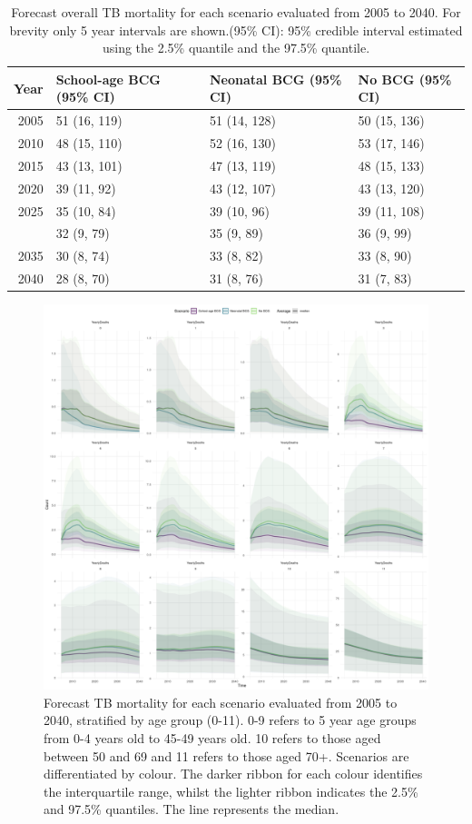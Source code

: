 \documentclass[11pt,twoside]{bristolthesis}
\begin{document}
  \begin{longtable}{rlll}
  \caption[Forecast overall TB mortality for each scenario evaluated from 2005 to 2040.]{\label{tab:10-table-deaths-preds}Forecast overall TB mortality for each scenario evaluated from 2005 to 2040. For brevity only 5 year intervals are shown.(95\% CI): 95\% credible interval estimated using the 2.5\% quantile and the 97.5\% quantile.}\\
  \toprule
  Year & School-age BCG (95\% CI) & Neonatal BCG (95\% CI) & No BCG (95\% CI)\\
  \midrule
  2005 & 51 (16, 119) & 51 (14, 128) & 50 (15, 136)\\
  2010 & 48 (15, 110) & 52 (16, 130) & 53 (17, 146)\\
  2015 & 43 (13, 101) & 47 (13, 119) & 48 (15, 133)\\
  2020 & 39 (11, 92) & 43 (12, 107) & 43 (13, 120)\\
  2025 & 35 (10, 84) & 39 (10, 96) & 39 (11, 108)\\
  \addlinespace
  2030 & 32 (9, 79) & 35 (9, 89) & 36 (9, 99)\\
  2035 & 30 (8, 74) & 33 (8, 82) & 33 (8, 90)\\
  2040 & 28 (8, 70) & 31 (8, 76) & 31 (7, 83)\\
  \bottomrule
  \end{longtable}
  \begin{figure}
  
  {\centering \includegraphics[width=0.8\linewidth]{chapters/model-fitting/plots/overview-scenarios-deaths-future-age-1} 
  
  }
  
  \caption[Forecast TB mortality for each scenario evaluated from 2005 to 2040, stratified by age group, stratified by age group.]{Forecast TB mortality for each scenario evaluated from 2005 to 2040, stratified by age group (0-11). 0-9 refers to 5 year age groups from 0-4 years old to 45-49 years old. 10 refers to those aged between 50 and 69 and 11 refers to those aged 70+. Scenarios are differentiated by colour. The darker ribbon for each colour identifies the interquartile range, whilst the lighter ribbon indicates the 2.5\% and 97.5\% quantiles. The line represents the median.}\label{fig:10-age-scenarios-deaths-fig}
  \end{figure}
\end{document}
